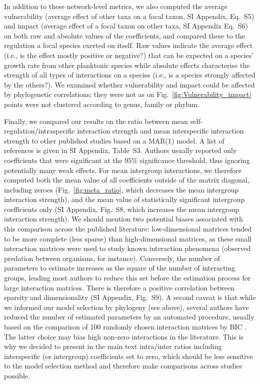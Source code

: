 \documentclass[9pt,twocolumn,twoside,lineno]{pnas-new}
\begin{document}
{In addition to these network-level metrics, we also computed the average
vulnerability (average effect of other taxa on a focal taxon, SI Appendix,
Eq.~S5) and impact (average effect of a focal taxon on other taxa,
SI Appendix Eq.~S6) on both raw and absolute values of the coefficients,
and compared these to the regulation a focal species exerted on itself.
Raw values indicate the average effect (i.e., is the effect mostly
positive or negative?) that can be expected on a species' growth rate
from other planktonic species while absolute effects characterise
the strength of all types of interactions on a species (i.e., is a
species strongly affected by the others?). We examined whether vulnerability
and impact could be affected by phylogenetic correlations; they were
not as on Fig.~\ref{fig:Vulnerability_impact} points were not clustered
according to genus, family or phylum.

Finally, we compared our results on the ratio between mean self-regulation/intraspecific
interaction strength and mean interspecific interaction strength to
other published studies based on a MAR(1) model. A list of references
is given in SI Appendix, Table~S3. Authors usually reported only
coefficients that were significant at the 95\% significance threshold,
thus ignoring potentially many weak effects. For mean intergroup interactions,
we therefore computed both the mean value of all coefficients outside
of the matrix diagonal, including zeroes (Fig.~\ref{fig:meta_ratio},
which decreases the mean intergroup interaction strength), and the
mean value of statistically significant intergroup coefficients only
(SI Appendix, Fig.~S8, which increases the mean intergroup interaction
strength). We should mention two potential biases associated with
this comparison across the published literature: low-dimensional matrices
tended to be more complete (less sparse) than high-dimensional matrices,
as these small interaction matrices were used to study known interaction
phenomena (observed predation between organisms, for instance). Conversely,
the number of parameters to estimate increases as the square of the
number of interacting groups, leading most authors to reduce this
set before the estimation process for large interaction matrices.
There is therefore a positive correlation between sparsity and dimensionality
(SI Appendix, Fig.~S9). A second caveat is that while we informed
our model selection by phylogeny (see above), several authors have
reduced the number of estimated parameters by an automated procedure,
usually based on the comparison of 100 randomly chosen interaction
matrices by BIC \cite{ives_estimating_2003}. The latter choice
may bias high non-zero interactions in the literature. This is why
we decided to present in the main text intra/inter ratios including
interspecific (or intergroup) coefficients set to zero, which should
be less sensitive to the model selection method and therefore make
comparisons across studies possible.

}
\end{document}
